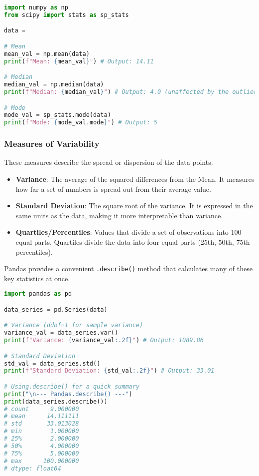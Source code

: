 \documentclass[11pt,a4paper]{article}
\begin{document}
\begin{lstlisting}[language=Python]
import numpy as np
from scipy import stats as sp_stats

data = 

# Mean
mean_val = np.mean(data)
print(f"Mean: {mean_val}") # Output: 14.11

# Median
median_val = np.median(data)
print(f"Median: {median_val}") # Output: 4.0 (unaffected by the outlier 100)

# Mode
mode_val = sp_stats.mode(data)
print(f"Mode: {mode_val.mode}") # Output: 5
\end{lstlisting}

\subsubsection{Measures of Variability}

These measures describe the spread or dispersion of the data points.
\begin{itemize}
    \item \textbf{Variance}: The average of the squared differences from the Mean. It measures how far a set of numbers is spread out from their average value.
    \item \textbf{Standard Deviation}: The square root of the variance. It is expressed in the same units as the data, making it more interpretable than variance.
    \item \textbf{Quartiles/Percentiles}: Values that divide a set of observations into 100 equal parts. Quartiles divide the data into four equal parts (25th, 50th, 75th percentiles).
\end{itemize}

Pandas provides a convenient \texttt{.describe()} method that calculates many of these key statistics at once.

\begin{lstlisting}[language=Python]
import pandas as pd

data_series = pd.Series(data)

# Variance (ddof=1 for sample variance)
variance_val = data_series.var()
print(f"Variance: {variance_val:.2f}") # Output: 1089.86

# Standard Deviation
std_val = data_series.std()
print(f"Standard Deviation: {std_val:.2f}") # Output: 33.01

# Using.describe() for a quick summary
print("\n--- Pandas.describe() ---")
print(data_series.describe())
# count      9.000000
# mean      14.111111
# std       33.013028
# min        1.000000
# 25%        2.000000
# 50%        4.000000
# 75%        5.000000
# max      100.000000
# dtype: float64
\end{lstlisting}
\end{document}
